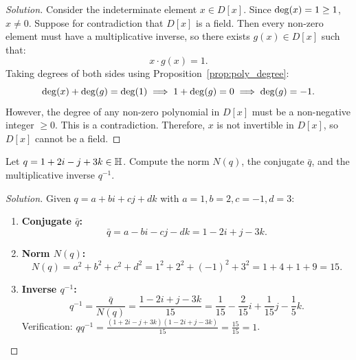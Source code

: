 \begin{proof}[Solution]
Consider the indeterminate element $x \in D[x]$.
Since $\operatorname{deg}(x) = 1 \ge 1$, $x \ne 0$.
Suppose for contradiction that $D[x]$ is a field.
Then every non-zero element must have a multiplicative inverse, so there exists $g(x) \in D[x]$ such that:
\begin{equation*}
x \cdot g(x) = 1.
\end{equation*}
Taking degrees of both sides using Proposition~\ref{prop:poly_degree}:
\begin{equation*}
\operatorname{deg}(x) + \operatorname{deg}(g) = \operatorname{deg}(1) \implies 1 + \operatorname{deg}(g) = 0 \implies \operatorname{deg}(g) = -1.
\end{equation*}
However, the degree of any non-zero polynomial in $D[x]$ must be a non-negative integer $\ge 0$.
This is a contradiction.
Therefore, $x$ is not invertible in $D[x]$, so $D[x]$ cannot be a field.
\end{proof}

\begin{problem}
Let $q = 1 + 2i - j + 3k \in \mathbb{H}$. Compute the norm $N(q)$, the conjugate $\bar{q}$, and the multiplicative inverse $q^{-1}$.
\end{problem}

\begin{proof}[Solution]
Given $q = a + bi + cj + dk$ with $a = 1, b = 2, c = -1, d = 3$:
\begin{enumerate}[label=\arabic*., leftmargin=*]
    \item \textbf{Conjugate $\bar{q}$:}
    \begin{equation*}
    \bar{q} = a - bi - cj - dk = 1 - 2i + j - 3k.
    \end{equation*}

    \item \textbf{Norm $N(q)$:}
    \begin{equation*}
    N(q) = a^2 + b^2 + c^2 + d^2 = 1^2 + 2^2 + (-1)^2 + 3^2 = 1 + 4 + 1 + 9 = 15.
    \end{equation*}

    \item \textbf{Inverse $q^{-1}$:}
    \begin{equation*}
    q^{-1} = \frac{\bar{q}}{N(q)} = \frac{1 - 2i + j - 3k}{15} = \frac{1}{15} - \frac{2}{15}i + \frac{1}{15}j - \frac{1}{5}k.
    \end{equation*}
    Verification: $q q^{-1} = \frac{(1+2i-j+3k)(1-2i+j-3k)}{15} = \frac{15}{15} = 1$.
\end{enumerate}
\end{proof}

